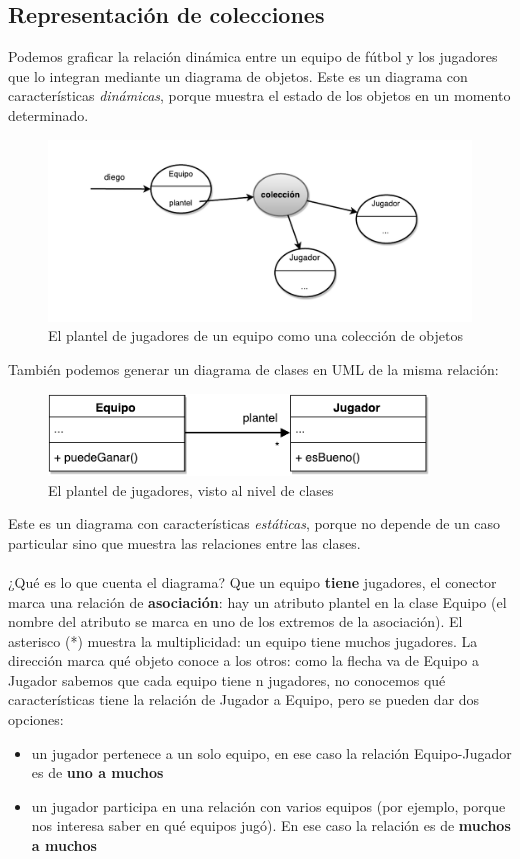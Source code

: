 \documentclass[a4paper,12pt]{book}
\begin{document}
\subsection{Representación de colecciones}
Podemos graficar la relación dinámica entre un equipo de fútbol y los jugadores que lo integran mediante un diagrama
de objetos. Este es un diagrama con características \textit{dinámicas}, porque muestra el estado 
de los objetos en un momento determinado.
\\
\begin{figure}[h!]
    \centering
    \includegraphics[width=1.1\textwidth]{images/02_Diagrama_Objetos_Equipo.pdf}
    \caption{El plantel de jugadores de un equipo como una colección de objetos}
\end{figure}
\FloatBarrier
También podemos generar un diagrama de clases en UML de la misma relación:
\begin{figure}[h!]
    \centering	
    \includegraphics[width=0.9\textwidth]{images/03_Diagrama_Clases_Equipo.pdf}
    \caption{El plantel de jugadores, visto al nivel de clases}
\end{figure}
\FloatBarrier
Este es un diagrama con características \textit{estáticas}, porque no depende de un caso particular
sino que muestra las relaciones entre las clases.\\
\\
¿Qué es lo que cuenta el diagrama? Que un equipo \textbf{tiene} jugadores, el conector marca una relación
de \textbf{asociación}: hay un atributo plantel en la clase Equipo (el nombre del atributo se marca en uno
de los extremos de la asociación). El asterisco (*) muestra la multiplicidad: un equipo tiene muchos jugadores.
La dirección marca qué objeto conoce a los otros: como la flecha va de Equipo a Jugador sabemos que cada equipo
tiene n jugadores, no conocemos qué características tiene la relación de Jugador a Equipo, pero se pueden dar
dos opciones:
\begin{itemize}
\item un jugador pertenece a un solo equipo, en ese caso la relación Equipo-Jugador es de \textbf{uno a muchos}
\item un jugador participa en una relación con varios equipos (por ejemplo, porque nos interesa saber
en qué equipos jugó). En ese caso la relación es de \textbf{muchos a muchos}
\end{itemize}
\end{document}
